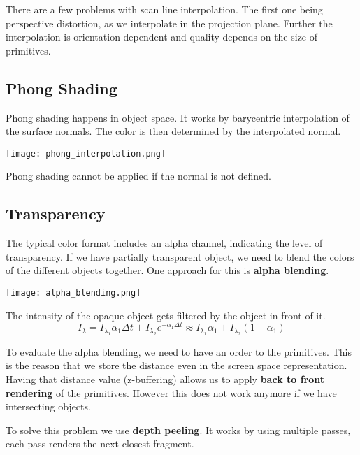 There are a few problems with scan line interpolation. The first one being perspective distortion, as we interpolate in the projection plane. Further the interpolation is orientation dependent and quality depends on the size of primitives.

\subsection{Phong Shading}

Phong shading happens in object space. It works by barycentric interpolation of the surface normals. The color is then determined by the interpolated normal.
\begin{center}
	\texttt{[image: phong\_interpolation.png]}
\end{center}

Phong shading cannot be applied if the normal is not defined.

\subsection{Transparency}

The typical color format includes an alpha channel, indicating the level of transparency. If we have partially transparent object, we need to blend the colors of the different objects together. One approach for this is \textbf{alpha blending}.
\begin{center}
	\texttt{[image: alpha\_blending.png]}
\end{center}

The intensity of the opaque object gets filtered by the object in front of it.
$$I_\lambda = I_{\lambda_1} \alpha_1 \Delta t + I_{\lambda_2} e^{- \alpha_1 \Delta t} \approx I_{\lambda_1} \alpha_1 + I_{\lambda_2} (1- \alpha_1)$$

To evaluate the alpha blending, we need to have an order to the primitives. This is the reason that we store the distance even in the screen space representation. Having that distance value (z-buffering) allows us to apply \textbf{back to front rendering} of the primitives. However this does not work anymore if we have intersecting objects. \medskip

To solve this problem we use \textbf{depth peeling}. It works by using multiple passes, each pass renders the next closest fragment.



















